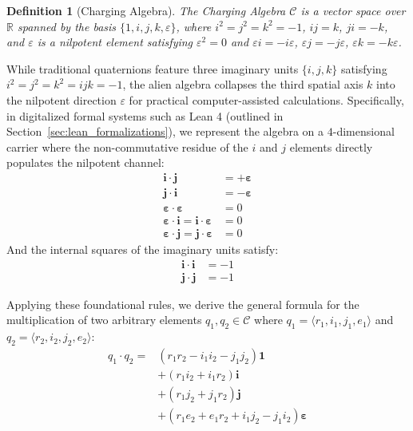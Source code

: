 \documentclass[11pt,a4paper]{book}
\newtheorem{definition}[theorem]{Definition}
\begin{document}
\begin{definition}[Charging Algebra]
The Charging Algebra $\mathcal{C}$ is a vector space over $\mathbb{R}$ spanned by the basis $\{1, i, j, k, \varepsilon\}$, where $i^2 = j^2 = k^2 = -1$, $ij = k$, $ji = -k$, and $\varepsilon$ is a nilpotent element satisfying $\varepsilon^2 = 0$ and $\varepsilon i = -i \varepsilon$, $\varepsilon j = -j \varepsilon$, $\varepsilon k = -k \varepsilon$.
\end{definition}

While traditional quaternions feature three imaginary units $\{i, j, k\}$ satisfying $i^2 = j^2 = k^2 = ijk = -1$, the alien algebra collapses the third spatial axis $k$ into the nilpotent direction $\varepsilon$ for practical computer-assisted calculations. Specifically, in digitalized formal systems such as Lean 4 (outlined in Section~\ref{sec:lean_formalizations}), we represent the algebra on a $4$-dimensional carrier where the non-commutative residue of the $i$ and $j$ elements directly populates the nilpotent channel:
\begin{align}
\mathbf{i} \cdot \mathbf{j} &= +\boldsymbol{\varepsilon} \label{eq:rule_ij} \\
\mathbf{j} \cdot \mathbf{i} &= -\boldsymbol{\varepsilon} \label{eq:rule_ji} \\
\boldsymbol{\varepsilon} \cdot \boldsymbol{\varepsilon} &= 0 \label{eq:rule_ee} \\
\boldsymbol{\varepsilon} \cdot \mathbf{i} = \mathbf{i} \cdot \boldsymbol{\varepsilon} &= 0 \label{eq:rule_ei} \\
\boldsymbol{\varepsilon} \cdot \mathbf{j} = \mathbf{j} \cdot \boldsymbol{\varepsilon} &= 0 \label{eq:rule_ej}
\end{align}
And the internal squares of the imaginary units satisfy:
\begin{align}
\mathbf{i} \cdot \mathbf{i} &= -1 \\
\mathbf{j} \cdot \mathbf{j} &= -1
\end{align}

Applying these foundational rules, we derive the general formula for the multiplication of two arbitrary elements $q_1, q_2 \in \mathcal{C}$ where $q_1 = \langle r_1, i_1, j_1, e_1 \rangle$ and $q_2 = \langle r_2, i_2, j_2, e_2 \rangle$:
\begin{equation}
\label{eq:general_mul_formula}
\begin{aligned}
q_1 \cdot q_2 = & \left( r_1 r_2 - i_1 i_2 - j_1 j_2 \right) \mathbf{1} \\
& + \left( r_1 i_2 + i_1 r_2 \right) \mathbf{i} \\
& + \left( r_1 j_2 + j_1 r_2 \right) \mathbf{j} \\
& + \left( r_1 e_2 + e_1 r_2 + i_1 j_2 - j_1 i_2 \right) \boldsymbol{\varepsilon}
\end{aligned}
\end{equation}
\end{document}
